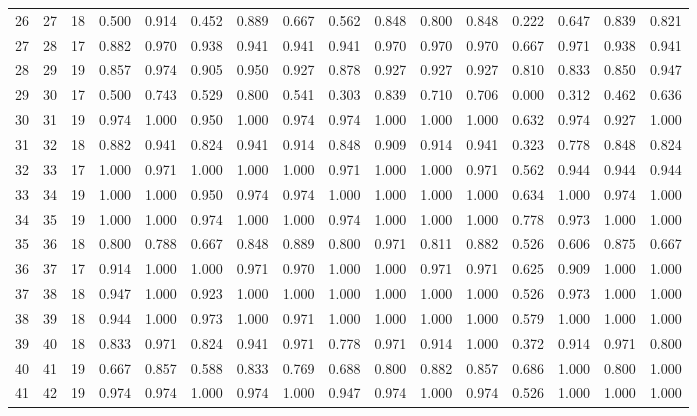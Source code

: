 \begin{longtable}{lrllllllllllllll}
26 & 27 & 18 & 0.500 & 0.914 & 0.452 & 0.889 & 0.667 & 0.562 & 0.848 & 0.800 & 0.848 & 0.222 & 0.647 & 0.839 & 0.821 \\
27 & 28 & 17 & 0.882 & 0.970 & 0.938 & 0.941 & 0.941 & 0.941 & 0.970 & 0.970 & 0.970 & 0.667 & 0.971 & 0.938 & 0.941 \\
28 & 29 & 19 & 0.857 & 0.974 & 0.905 & 0.950 & 0.927 & 0.878 & 0.927 & 0.927 & 0.927 & 0.810 & 0.833 & 0.850 & 0.947 \\
29 & 30 & 17 & 0.500 & 0.743 & 0.529 & 0.800 & 0.541 & 0.303 & 0.839 & 0.710 & 0.706 & 0.000 & 0.312 & 0.462 & 0.636 \\
30 & 31 & 19 & 0.974 & 1.000 & 0.950 & 1.000 & 0.974 & 0.974 & 1.000 & 1.000 & 1.000 & 0.632 & 0.974 & 0.927 & 1.000 \\
31 & 32 & 18 & 0.882 & 0.941 & 0.824 & 0.941 & 0.914 & 0.848 & 0.909 & 0.914 & 0.941 & 0.323 & 0.778 & 0.848 & 0.824 \\
32 & 33 & 17 & 1.000 & 0.971 & 1.000 & 1.000 & 1.000 & 0.971 & 1.000 & 1.000 & 0.971 & 0.562 & 0.944 & 0.944 & 0.944 \\
33 & 34 & 19 & 1.000 & 1.000 & 0.950 & 0.974 & 0.974 & 1.000 & 1.000 & 1.000 & 1.000 & 0.634 & 1.000 & 0.974 & 1.000 \\
34 & 35 & 19 & 1.000 & 1.000 & 0.974 & 1.000 & 1.000 & 0.974 & 1.000 & 1.000 & 1.000 & 0.778 & 0.973 & 1.000 & 1.000 \\
35 & 36 & 18 & 0.800 & 0.788 & 0.667 & 0.848 & 0.889 & 0.800 & 0.971 & 0.811 & 0.882 & 0.526 & 0.606 & 0.875 & 0.667 \\
36 & 37 & 17 & 0.914 & 1.000 & 1.000 & 0.971 & 0.970 & 1.000 & 1.000 & 0.971 & 0.971 & 0.625 & 0.909 & 1.000 & 1.000 \\
37 & 38 & 18 & 0.947 & 1.000 & 0.923 & 1.000 & 1.000 & 1.000 & 1.000 & 1.000 & 1.000 & 0.526 & 0.973 & 1.000 & 1.000 \\
38 & 39 & 18 & 0.944 & 1.000 & 0.973 & 1.000 & 0.971 & 1.000 & 1.000 & 1.000 & 1.000 & 0.579 & 1.000 & 1.000 & 1.000 \\
39 & 40 & 18 & 0.833 & 0.971 & 0.824 & 0.941 & 0.971 & 0.778 & 0.971 & 0.914 & 1.000 & 0.372 & 0.914 & 0.971 & 0.800 \\
40 & 41 & 19 & 0.667 & 0.857 & 0.588 & 0.833 & 0.769 & 0.688 & 0.800 & 0.882 & 0.857 & 0.686 & 1.000 & 0.800 & 1.000 \\
41 & 42 & 19 & 0.974 & 0.974 & 1.000 & 0.974 & 1.000 & 0.947 & 0.974 & 1.000 & 0.974 & 0.526 & 1.000 & 1.000 & 1.000 \\
\end{longtable}
